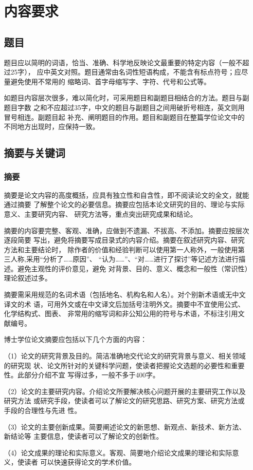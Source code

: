 \section{内容要求}
\subsection{题目}

题目应以简明的词语，恰当、准确、科学地反映论文最重要的特定内容（一般不超过25字），
应中英文对照。题目通常由名词性短语构成，不能含有标点符号；应尽量避免使用不常用的
缩略词、首字母缩写字、字符、代号和公式等。

如题目内容层次很多，难以简化时，可采用题目和副题目相结合的方法。题目与副题目字数
之和不应超过35字，中文的题目与副题目之间用破折号相连，英文则用冒号相连。副题目起
补充、阐明题目的作用。题目和副题目在整篇学位论文中的不同地方出现时，应保持一致。

\subsection{摘要与关键词}
\subsubsection{摘要}

摘要是论文内容的高度概括，应具有独立性和自含性，即不阅读论文的全文，就能通过摘要
了解整个论文的必要信息。摘要应包括本论文研究的目的、理论与实际意义、主要研究内容、
研究方法等，重点突出研究成果和结论。

摘要的内容要完整、客观、准确，应做到不遗漏、不拔高、不添加。摘要应按层次逐段简要
写出，避免将摘要写成目录式的内容介绍。摘要在叙述研究内容、研究方法和主要结论时，
除作者的价值和经验判断可以使用第一人称外，一般使用第三人称,采用“分析了……原因”、
“认为……”、“对……进行了探讨”等记述方法进行描述。避免主观性的评价意见，避免
对背景、目的、意义、概念和一般性（常识性）理论叙述过多。

摘要需采用规范的名词术语（包括地名、机构名和人名）。对个别新术语或无中文译文的术
语，可用外文或在中文译文后加括号注明外文。摘要中不宜使用公式、化学结构式、图表、
非常用的缩写词和非公知公用的符号与术语，不标注引用文献编号。

博士学位论文摘要应包括以下几个方面的内容：

（1）论文的研究背景及目的。简洁准确地交代论文的研究背景与意义、相关领域的研究现
状、论文所针对的关键科学问题，使读者把握论文选题的必要性和重要性。此部分介绍不宜
写得过多，一般不多于400字。

（2）论文的主要研究内容。介绍论文所要解决核心问题开展的主要研究工作以及研究方法
或研究手段，使读者可以了解论文的研究思路、研究方案、研究方法或手段的合理性与先进
性。

（3）论文的主要创新成果。简要阐述论文的新思想、新观点、新技术、新方法、新结论等
主要信息，使读者可以了解论文的创新性。

（4）论文成果的理论和实际意义。客观、简要地介绍论文成果的理论和实际意义，使读者
可以快速获得论文的学术价值。

